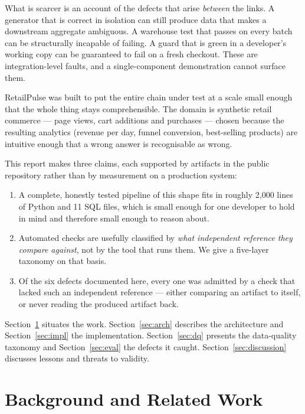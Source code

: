 \documentclass[conference]{IEEEtran}
\begin{document}
What is scarcer is an account of the defects that arise \emph{between} the
links. A generator that is correct in isolation can still produce data that
makes a downstream aggregate ambiguous. A warehouse test that passes on every
batch can be structurally incapable of failing. A guard that is green in a
developer's working copy can be guaranteed to fail on a fresh checkout. These
are integration-level faults, and a single-component demonstration cannot
surface them.

RetailPulse was built to put the entire chain under test at a scale small
enough that the whole thing stays comprehensible. The domain is synthetic
retail commerce --- page views, cart additions and purchases --- chosen because
the resulting analytics (revenue per day, funnel conversion, best-selling
products) are intuitive enough that a wrong answer is recognisable as wrong.

This report makes three claims, each supported by artifacts in the public
repository rather than by measurement on a production system:

\begin{enumerate}
\item A complete, honestly tested pipeline of this shape fits in roughly 2{,}000
  lines of Python and 11 SQL files, which is small enough for one developer to
  hold in mind and therefore small enough to reason about.
\item Automated checks are usefully classified by \emph{what independent
  reference they compare against}, not by the tool that runs them. We give a
  five-layer taxonomy on that basis.
\item Of the six defects documented here, every one was admitted by a check
  that lacked such an independent reference --- either comparing an artifact to
  itself, or never reading the produced artifact back.
\end{enumerate}

Section~\ref{sec:related} situates the work. Section~\ref{sec:arch} describes
the architecture and Section~\ref{sec:impl} the implementation.
Section~\ref{sec:dq} presents the data-quality taxonomy and
Section~\ref{sec:eval} the defects it caught. Section~\ref{sec:discussion}
discusses lessons and threats to validity.

\section{Background and Related Work}
\label{sec:related}
\end{document}
